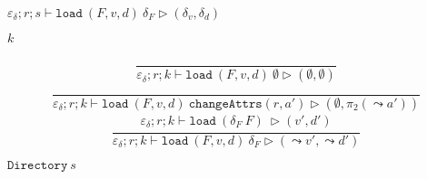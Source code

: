 \documentclass{report}
\theoremstyle{theorem}
\begin{document}
$\boxed{\varepsilon_\delta ; r ; s \vdash \mathtt{load}~ (F,v,d)~ \delta_F \rhd (\delta_v,\delta_d)}$
	
$\boxed{k}$

\begin{displaymath}
	\frac{\begin{array}{c}
	\end{array}}
	{\varepsilon_\delta ; r ; k \vdash \mathtt{load}~ (F,v,d)~ \emptyset \rhd (\emptyset,\emptyset)}
\end{displaymath}
\begin{displaymath}
	\frac{\begin{array}{c}
	\end{array}}
	{\varepsilon_\delta ; r ; k \vdash \mathtt{load}~ (F,v,d)~ \mathtt{changeAttrs}(r,a') \rhd (\emptyset,\pi_2(\leadsto a'))}
\end{displaymath}
\begin{displaymath}
	\frac{\begin{array}{c}
		\varepsilon_\delta ; r ; k \vdash \mathtt{load}~ (\delta_F~ F)~  \rhd (v',d')
	\end{array}}
	{\varepsilon_\delta ; r ; k \vdash \mathtt{load}~ (F,v,d)~ \delta_F \rhd (\leadsto v',\leadsto d')}
\end{displaymath}

$\boxed{\mathtt{Directory}~s}$
\end{document}
